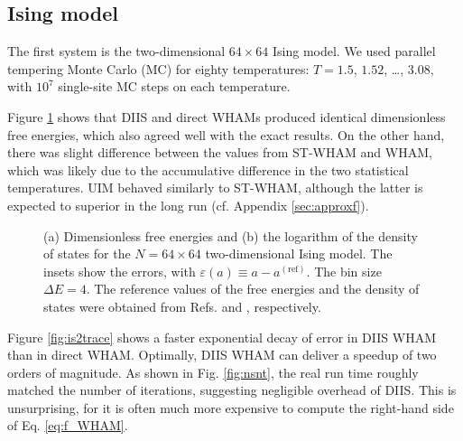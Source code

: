 \documentclass[reprint,aip,jcp,superscriptaddress]{revtex4-1}
\begin{document}
\subsection{\label{sec:results_Ising}
Ising model}





The first system is
the two-dimensional $64\times64$ Ising model.
%
We used parallel tempering\cite{
swendsen1986, *geyer1991, *hukushima1996, *hansmann1997,
*earl2005}
Monte Carlo (MC)
for
eighty temperatures: $T = 1.5$, $1.52$, \dots, $3.08$,
with $10^7$ single-site MC steps on each temperature.



Figure \ref{fig:is2ref} shows that
DIIS and direct WHAMs produced identical
dimensionless free energies, which also
agreed well with the exact results\cite{
ferdinand1969}.
%
On the other hand,
there was slight difference between
the values from ST-WHAM and WHAM,
which was likely due to
the accumulative difference
in the two statistical temperatures.
%
UIM behaved similarly to ST-WHAM,
although the latter is expected to superior
in the long run (cf. Appendix \ref{sec:approxf}).



\begin{figure}[h]
  \caption{
    \label{fig:is2ref}
    (a) Dimensionless free energies and
    (b) the logarithm of the density of states
    for the $N = 64\times64$ two-dimensional Ising model.
    The insets show the errors, with
    $\varepsilon(a) \equiv a - a^\mathrm{(ref)}$.
    The bin size $\Delta E = 4$.
    The reference values of the free energies and
    the density of states were obtained
    from Refs.  and ,
    respectively.
  }
\end{figure}




Figure \ref{fig:is2trace}
shows a faster exponential decay of error
in DIIS WHAM
than in direct WHAM.
%
Optimally, DIIS WHAM can
deliver a speedup of two orders of magnitude.
%
As shown in Fig. \ref{fig:nsnt},
the real run time roughly matched
the number of iterations,
suggesting negligible overhead of DIIS.
%
This is unsurprising,
for it is often much more expensive to compute
the right-hand side of Eq. \eqref{eq:f_WHAM}.
\end{document}
